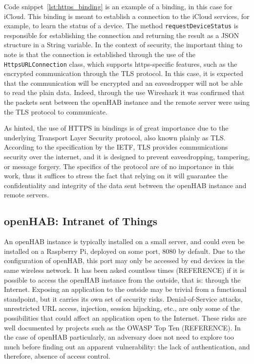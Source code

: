 \documentclass[12pt]{article}
\newcommand{\TODO}{\todo[inline]}
\begin{document}
Code snippet~\ref{lst:https_binding} is an example of a binding, in this case for iCloud. This binding is meant to establish a connection to the iCloud services, for example, to learn the status of a device. The method \texttt{requestDeviceStatus} is responsible for establishing the connection and returning the result as a JSON structure in a String variable. In the context of security, the important thing to note is that the connection is established through the use of the \texttt{HttpsURLConnection} class, which supports https-specific features, such as the encrypted communication through the TLS protocol. In this case, it is expected that the communication will be encrypted and an eavesdropper will not be able to read the plain data. Indeed, through the use Wireshark it was confirmed that the packets sent between the openHAB instance and the remote server were using the TLS protocol to communicate.

\TODO{REFERENCE}
As hinted, the use of HTTPS in bindings is of great importance due to the underlying Transport Layer Security protocol, also known plainly as TLS. According to the specification by the IETF, TLS provides communications security over the internet, and it is designed to prevent eavesdropping, tampering, or message forgery. The specifics of the protocol are of no importance in this work, thus it suffices to stress the fact that relying on it will guarantee the confidentiality and integrity of the data sent between the openHAB instance and remote servers.

\subsection{openHAB: Intranet of Things}

\TODO{REFERENCES}
An openHAB instance is typically installed on a small server, and could even be installed on a Raspberry Pi, deployed on some port, 8080 by default. Due to the configuration of openHAB, this port may only be accessed by end devices in the same wireless network. It has been asked countless times (REFERENCE) if it is possible to access the openHAB instance from the outside, that is: through the Internet. Exposing an application to the outside may be trivial from a functional standpoint, but it carries its own set of security risks. Denial-of-Service attacks, unrestricted URL access, injection, session hijacking, etc., are only some of the possibilities that could affect an application open to the Internet. These risks are well documented by projects such as the OWASP Top Ten (REFERENCE). In the case of openHAB particularly, an adversary does not need to explore too much before finding out an apparent vulnerability: the lack of authentication, and therefore, absence of access control.
\end{document}
